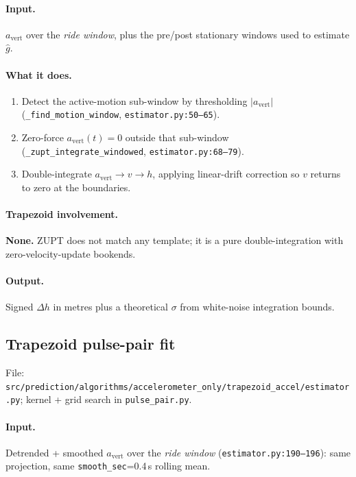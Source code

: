 \documentclass[11pt,a4paper]{article}
\newcommand{\avert}{a_{\mathrm{vert}}}
\begin{document}
\paragraph{Input.}
$\avert$ over the \emph{ride window}, plus the pre/post stationary
windows used to estimate $\hat g$.

\paragraph{What it does.}
\begin{enumerate}\setlength\itemsep{2pt}
  \item Detect the active-motion sub-window by thresholding
        $|\avert|$ (\texttt{\_find\_motion\_window}, \texttt{estimator.py:50--65}).
  \item Zero-force $\avert(t)=0$ outside that sub-window
        (\texttt{\_zupt\_integrate\_windowed}, \texttt{estimator.py:68--79}).
  \item Double-integrate $\avert \to v \to h$, applying linear-drift
        correction so $v$ returns to zero at the boundaries.
\end{enumerate}

\paragraph{Trapezoid involvement.}
\textbf{None.} ZUPT does not match any template; it is a pure
double-integration with zero-velocity-update bookends.

\paragraph{Output.}
Signed $\Delta h$ in metres plus a theoretical $\sigma$ from white-noise integration bounds.

\subsection{Trapezoid pulse-pair fit}
File: \texttt{src/prediction/algorithms/accelerometer\_only/trapezoid\_accel/estimator.py}; kernel + grid search in \texttt{pulse\_pair.py}.

\paragraph{Input.}
Detrended + smoothed $\avert$ over the \emph{ride window}
(\texttt{estimator.py:190--196}): same projection, same
\texttt{smooth\_sec}=0.4\,s rolling mean.
\end{document}
